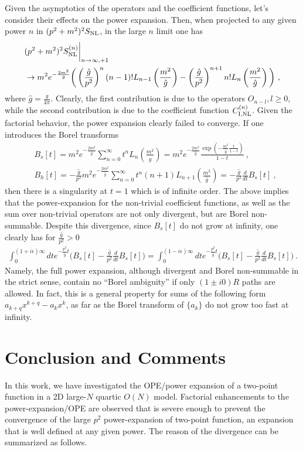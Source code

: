 \documentclass[a4paper,11pt]{article}
\begin{document}
Given the asymptotics of the operators and the coefficient functions, let's consider their effects on the power expansion. Then, when projected to any given power $n$ in $(p^2+m^2)^2S_{\rm NL}$, in the large $n$ limit one has 
\begin{align}
&(p^2+m^2)^2S_{\rm NL}^{(n)}\bigg|_{n\rightarrow\infty,+1} \nonumber \\ 
&\rightarrow m^2e^{-\frac{2m^2}{\hat g}} \bigg(\left(\frac{\hat g}{p^2}\right)^n(n-1)!L_{n-1}\left(\frac{m^2}{\hat g}\right)-\left(\frac{\hat g}{p^2}\right)^{n+1}n!L_{n}\left(\frac{m^2}{\hat g}\right)\bigg) \ ,
\end{align}
where $\hat g=\frac{g}{4\pi }$. Clearly, the first contribution is due to the operators $O_{n-l},l \ge 0$, while the second contribution is due to the coefficient function $C_{{\rm I},{\rm NL}}^{(n)}$. Given the factorial behavior, the power expansion clearly failed to converge. If one introduces the Borel transforms
\begin{align}
&B_s[t]=m^2e^{-\frac{2m^2}{\hat g}}\sum_{n=0}^{\infty}t^n
L_n\left(\frac{m^2}{\hat g}\right)=m^2e^{-\frac{2m^2}{\hat g}}\frac{\exp \left(-\frac{ m^2}{\hat g}\frac{t}{1-t}\right)}{1-t} \ , \\ 
&B_h[t]=-\frac{\hat g}{p^2}m^2e^{-\frac{2m^2}{\hat g}}\sum_{n=0}^{\infty}t^n(n+1)L_{n+1}\left(\frac{m^2}{\hat g}\right)=-\frac{\hat g}{p^2}\frac{d}{dt}B_s[t] \ , 
\end{align}
then there is a singularity at $t=1$ which is of infinite order. The above implies that the power-expansion for the non-trivial coefficient functions, as well as the sum over non-trivial operators are not only divergent, but are  Borel non-summable. Despite this divergence, since $B_s[t]$ do not grow at infinity, one clearly has for $\frac{\hat g}{p^2}>0$
\begin{align}
\int_{0}^{(1+i\epsilon)\infty}dt e^{-\frac{p^2}{\hat g}t} \bigg(B_s[t]-\frac{\hat g}{p^2}\frac{d}{dt}B_s[t]\bigg)=\int_{0}^{(1-i\epsilon)\infty}dt e^{-\frac{p^2}{\hat g}t} \bigg(B_s[t]-\frac{\hat g}{p^2}\frac{d}{dt}B_s[t]\bigg) \ .
\end{align}
Namely, the full power expansion, although divergent and Borel non-summable in the strict sense, contain no ``Borel ambiguity'' if only $(1\pm i0)R$ paths are allowed. In fact, this is a general property for sums of the following form $a_{k+q}x^{k+q}-a_kx^k$, as far as the Borel transform of $\{a_k\}$ do not grow too fast at infinity. 

\section{Conclusion and Comments}\label{sec:conclu}
In this work, we have investigated the OPE/power expansion of a two-point function in a 2D large-$N$ quartic $O(N)$ model. Factorial enhancements to the power-expansion/OPE are observed that is severe enough to prevent the convergence of the large $p^2$ power-expansion of two-point function, an expansion that is well defined at any given power. The reason of the divergence can be summarized as follows. 
\end{document}
